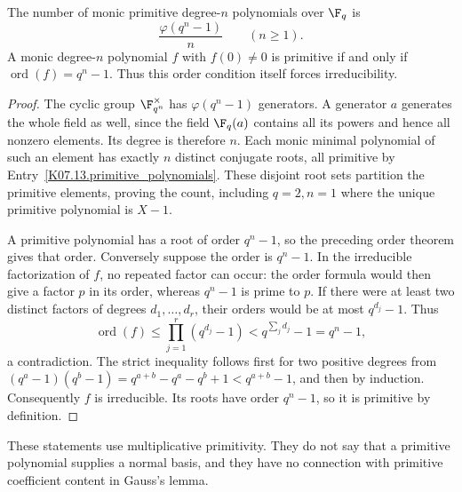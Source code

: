 \begin{theorem}
The number of monic primitive degree-$n$ polynomials over $\F_q$ is
\[\frac{\varphi(q^n-1)}{n}\qquad(n\geq1).\]
A monic degree-$n$ polynomial $f$ with $f(0)\ne0$ is primitive if and only if $\operatorname{ord}(f)=q^n-1$. Thus this order condition itself forces irreducibility.
\end{theorem}
\begin{proof}
The cyclic group $\F_{q^n}^\times$ has $\varphi(q^n-1)$ generators. A generator $a$ generates the whole field as well, since the field $\F_q(a)$ contains all its powers and hence all nonzero elements. Its degree is therefore $n$. Each monic minimal polynomial of such an element has exactly $n$ distinct conjugate roots, all primitive by Entry~\ref{K07.13.primitive_polynomials}. These disjoint root sets partition the primitive elements, proving the count, including $q=2,n=1$ where the unique primitive polynomial is $X-1$.

A primitive polynomial has a root of order $q^n-1$, so the preceding order theorem gives that order. Conversely suppose the order is $q^n-1$. In the irreducible factorization of $f$, no repeated factor can occur: the order formula would then give a factor $p$ in its order, whereas $q^n-1$ is prime to $p$. If there were at least two distinct factors of degrees $d_1,\ldots,d_r$, their orders would be at most $q^{d_j}-1$. Thus
\[\operatorname{ord}(f)\leq\prod_{j=1}^r(q^{d_j}-1)<q^{\sum_jd_j}-1=q^n-1,\]
a contradiction. The strict inequality follows first for two positive degrees from $(q^a-1)(q^b-1)=q^{a+b}-q^a-q^b+1<q^{a+b}-1$, and then by induction. Consequently $f$ is irreducible. Its roots have order $q^n-1$, so it is primitive by definition.
\end{proof}
\begin{remark}
These statements use multiplicative primitivity. They do not say that a primitive polynomial supplies a normal basis, and they have no connection with primitive coefficient content in Gauss's lemma.
\end{remark}

